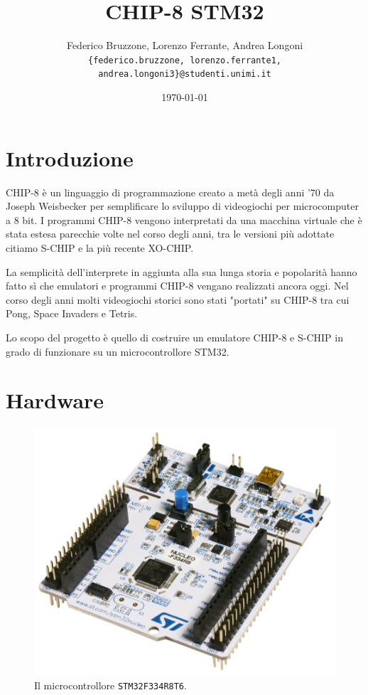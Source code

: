 \documentclass[a4paper]{article}
\title{CHIP-8 STM32}
\date{\today}
\author{Federico Bruzzone, Lorenzo Ferrante, Andrea Longoni \\
\footnotesize \texttt{\{federico.bruzzone, lorenzo.ferrante1, andrea.longoni3\}@studenti.unimi.it} \\ }
\begin{document}
\maketitle

\section{Introduzione}

CHIP-8 è un linguaggio di programmazione creato a metà degli anni '70 da
Joseph Weisbecker per semplificare lo sviluppo di videogiochi per microcomputer
a 8 bit. I programmi CHIP-8 vengono interpretati da una macchina virtuale che è
stata estesa parecchie volte nel corso degli anni, tra le versioni più adottate
citiamo S-CHIP e la più recente XO-CHIP.

La semplicità dell'interprete in aggiunta alla sua lunga storia e popolarità
hanno fatto sì che emulatori e programmi CHIP-8 vengano realizzati ancora oggi.
Nel corso degli anni molti videogiochi storici sono stati "portati" su CHIP-8
tra cui Pong, Space Invaders e Tetris.

Lo scopo del progetto è quello di costruire un emulatore CHIP-8 e S-CHIP in
grado di funzionare su un microcontrollore STM32.

\section{Hardware}


\begin{figure}
\begin{center}
    \includegraphics[scale=0.20]{figures/stm32f334.jpg}
\end{center}
\caption{Il microcontrollore \texttt{STM32F334R8T6}.}
\label{fig:weact_blackpill}
\end{figure}
\end{document}
